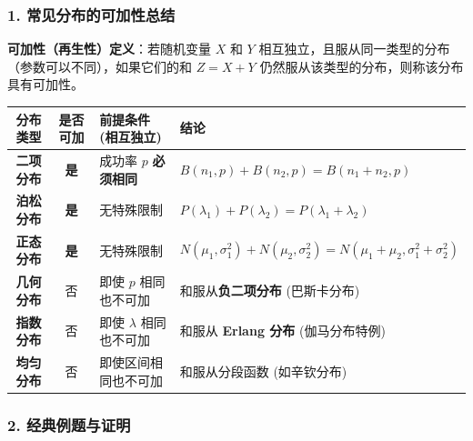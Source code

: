 
\vspace{1.5em}
\subsubsection*{1. 常见分布的可加性总结}

\textbf{可加性（再生性）定义}：若随机变量 $X$ 和 $Y$ 相互独立，且服从同一类型的分布（参数可以不同），如果它们的和 $Z = X + Y$ 仍然服从该类型的分布，则称该分布具有可加性。

\begin{center}
    \renewcommand{\arraystretch}{1.5} %
    \begin{tabular}{|c|c|l|l|}
        \hline
        \textbf{分布类型} & \textbf{是否可加} & \textbf{前提条件 (相互独立)} & \textbf{结论} \\
        \hline
        \textbf{二项分布} & \textbf{是} & 成功率 $p$ \textbf{必须相同} & $B(n_1, p) + B(n_2, p) = B(n_1+n_2, p)$ \\
        \hline
        \textbf{泊松分布} & \textbf{是} & 无特殊限制 & $P(\lambda_1) + P(\lambda_2) = P(\lambda_1 + \lambda_2)$ \\
        \hline
        \textbf{正态分布} & \textbf{是} & 无特殊限制 & $N(\mu_1, \sigma_1^2) + N(\mu_2, \sigma_2^2) = N(\mu_1+\mu_2, \sigma_1^2+\sigma_2^2)$ \\
        \hline
        \textbf{几何分布} & 否 & 即使 $p$ 相同也不可加 & 和服从\textbf{负二项分布} (巴斯卡分布) \\
        \hline
        \textbf{指数分布} & 否 & 即使 $\lambda$ 相同也不可加 & 和服从 \textbf{Erlang 分布} (伽马分布特例) \\
        \hline
        \textbf{均匀分布} & 否 & 即使区间相同也不可加 & 和服从分段函数 (如辛钦分布) \\
        \hline
    \end{tabular}
\end{center}


\vspace{1.5em}
\subsubsection*{2. 经典例题与证明}

